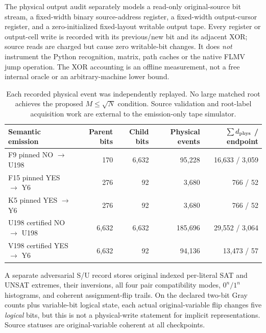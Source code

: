 \documentclass[11pt]{article}
\begin{document}
The physical output audit separately models a read-only original-source bit stream, a fixed-width binary source-address register, a fixed-width output-cursor register, and a zero-initialized fixed-layout writable output tape. Every register or output-cell write is recorded with its previous/new bit and its adjacent XOR; source reads are charged but cause zero writable-bit changes. It does \emph{not} instrument the Python recognition, matrix, path caches or the native FLMV jump operation. The XOR accounting is an offline measurement, not a free internal oracle or an arbitrary-machine lower bound.

\begin{table}[ht]
\centering\small
\begin{tabular}{lrrrr}
\toprule
Semantic emission & Parent bits & Child bits & Physical events & $\sum d_{\rm phys}$ / endpoint \\
\midrule
F9 pinned NO $\to$ U198 & 170 & 6,632 & 95,228 & 16,633 / 3,059 \\
F15 pinned YES $\to$ Y6 & 276 & 92 & 3,680 & 766 / 52 \\
K5 pinned YES $\to$ Y6 & 276 & 92 & 3,680 & 766 / 52 \\
U198 certified NO $\to$ U198 & 6,632 & 6,632 & 185,696 & 29,552 / 3,064 \\
V198 certified YES $\to$ Y6 & 6,632 & 92 & 94,136 & 13,473 / 57 \\
\bottomrule
\end{tabular}
\caption{Each recorded physical event was independently replayed. No large matched root achieves the proposed $M\le\sqrt{N}$ condition. Source validation and root-label acquisition work are external to the emission-only tape simulator.}
\end{table}

A separate adversarial S/U record stores original indexed per-literal SAT and UNSAT extremes, their inversions, all four pair compatibility modes, $0^n/1^n$ histograms, and coherent assignment-flip trails. On the declared two-bit Gray counts plus variable-bit logical state, each actual original-variable flip changes five \emph{logical} bits, but this is not a physical-write statement for implicit representations. Source statuses are original-variable coherent at all checkpoints.
\end{document}
